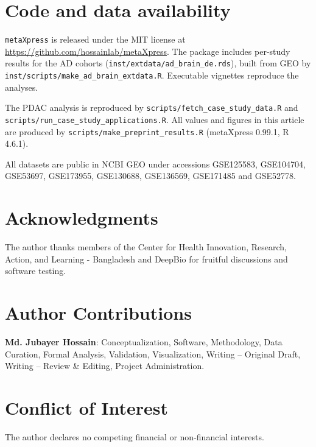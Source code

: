 \documentclass[11pt,a4paper]{article}
\begin{document}
\section{Code and data availability}
\texttt{metaXpress} is released under the MIT license at \url{https://github.com/hossainlab/metaXpress}. The package includes per-study results for the AD cohorts (\nolinkurl{inst/extdata/ad_brain_de.rds}), built from GEO by \nolinkurl{inst/scripts/make_ad_brain_extdata.R}. Executable vignettes reproduce the analyses.

The PDAC analysis is reproduced by \nolinkurl{scripts/fetch_case_study_data.R} and \nolinkurl{scripts/run_case_study_applications.R}. All values and figures in this article are produced by \nolinkurl{scripts/make_preprint_results.R} (metaXpress 0.99.1, R 4.6.1).

All datasets are public in NCBI GEO under accessions GSE125583, GSE104704, GSE53697, GSE173955, GSE130688, GSE136569, GSE171485 and GSE52778.

\section*{Acknowledgments}
The author thanks members of the Center for Health Innovation, Research, Action, and Learning - Bangladesh and DeepBio for fruitful discussions and software testing.

\section*{Author Contributions}
\textbf{Md. Jubayer Hossain}: Conceptualization, Software, Methodology, Data Curation, Formal Analysis, Validation, Visualization, Writing -- Original Draft, Writing -- Review \& Editing, Project Administration.

\section*{Conflict of Interest}
The author declares no competing financial or non-financial interests.

\begingroup
\footnotesize
\makeatletter
\renewcommand{\@openbib@code}{\setlength{\itemsep}{1pt plus 0.5pt}\setlength{\parsep}{0pt}\setlength{\parskip}{0pt}}
\makeatother


\endgroup
\end{document}

